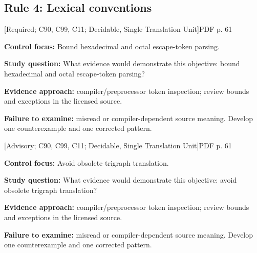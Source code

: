 \documentclass[10pt,letterpaper]{article}
\begin{document}
\subsection{Rule 4: Lexical conventions}
 \textsf{\footnotesize [Required; C90, C99, C11; Decidable, Single Translation Unit]}\hfill{\footnotesize PDF p. 61}\par
\textbf{Control focus:} Bound hexadecimal and octal escape-token parsing.\par
\textbf{Study question:} What evidence would demonstrate this objective: bound hexadecimal and octal escape-token parsing?\par
\textbf{Evidence approach:} compiler/preprocessor token inspection; review bounds and exceptions in the licensed source.\par
\textbf{Failure to examine:} misread or compiler-dependent source meaning. Develop one counterexample and one corrected pattern.\par
\smallskip
{}
 \textsf{\footnotesize [Advisory; C90, C99, C11; Decidable, Single Translation Unit]}\hfill{\footnotesize PDF p. 61}\par
\textbf{Control focus:} Avoid obsolete trigraph translation.\par
\textbf{Study question:} What evidence would demonstrate this objective: avoid obsolete trigraph translation?\par
\textbf{Evidence approach:} compiler/preprocessor token inspection; review bounds and exceptions in the licensed source.\par
\textbf{Failure to examine:} misread or compiler-dependent source meaning. Develop one counterexample and one corrected pattern.\par
\smallskip
\end{document}
